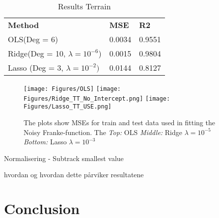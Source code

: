 \documentclass[...,numrefs]{wiley-article}
\begin{document}
\begin{table}[h]
\centering
\caption{Results Terrain}
\begin{tabular}{lll}
\textbf{Method} & \textbf{MSE} & \textbf{R2}  \\
 OLS(Deg = 6) & 0.0034 & 0.9551 \\
 Ridge(Deg = 10, $\lambda = 10^{-6}$) &  0.0015   &  0.9804  \\
 Lasso (Deg = 3, $\lambda = 10^{-2})$ &  0.0144  &  0.8127 
\label{terrain_table}
\end{tabular}
\end{table}



\begin{figure}[h!]
    \centering
    \texttt{[image: Figures/OLS]}
    \texttt{[image: Figures/Ridge\_TT\_No\_Intercept.png]}
    \texttt{[image: Figures/Lasso\_TT\_USE.png]}
    \caption[Bias-Variance-Trade Off]{The plots show MSEs for train and test data used in fitting the Noisy Franke-function. The 
    \textit{Top:} OLS \textit{Middle:} Ridge $\lambda = 10^{-5}$ \textit{Bottom:} Lasso $\lambda = 10^{-3}$}
   \label{TT}
\end{figure}







\clearpage






Normalisering - Subtrack smallest value 

hvordan og hvordan dette pårviker resultatene 




\section{Conclusion}
\end{document}
